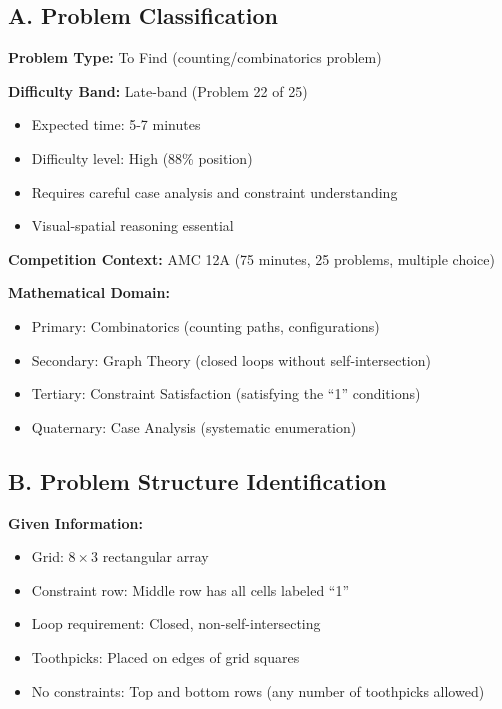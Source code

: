 \documentclass[12pt]{article}
\begin{document}
\begin{problemconfigbox}

\subsection*{A. Problem Classification}

\textbf{Problem Type:} To Find (counting/combinatorics problem)

\textbf{Difficulty Band:} Late-band (Problem 22 of 25)
\begin{itemize}
    \item Expected time: 5-7 minutes
    \item Difficulty level: High (88\% position)
    \item Requires careful case analysis and constraint understanding
    \item Visual-spatial reasoning essential
\end{itemize}

\textbf{Competition Context:} AMC 12A (75 minutes, 25 problems, multiple choice)

\textbf{Mathematical Domain:} 
\begin{itemize}
    \item Primary: Combinatorics (counting paths, configurations)
    \item Secondary: Graph Theory (closed loops without self-intersection)
    \item Tertiary: Constraint Satisfaction (satisfying the ``1'' conditions)
    \item Quaternary: Case Analysis (systematic enumeration)
\end{itemize}

\subsection*{B. Problem Structure Identification}

\textbf{Given Information:}
\begin{itemize}
    \item Grid: $8 \times 3$ rectangular array
    \item Constraint row: Middle row has all cells labeled ``1''
    \item Loop requirement: Closed, non-self-intersecting
    \item Toothpicks: Placed on edges of grid squares
    \item No constraints: Top and bottom rows (any number of toothpicks allowed)
\end{itemize}


\end{problemconfigbox}
\end{document}
